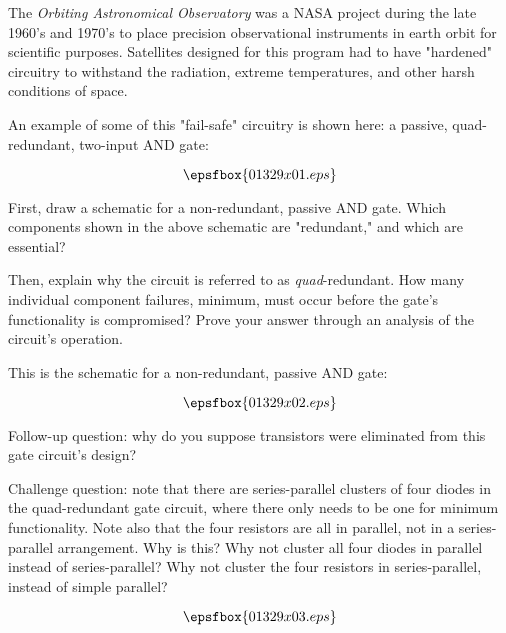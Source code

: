 

The {\it Orbiting Astronomical Observatory} was a NASA project during the late 1960's and 1970's to place precision observational instruments in earth orbit for scientific purposes.  Satellites designed for this program had to have "hardened" circuitry to withstand the radiation, extreme temperatures, and other harsh conditions of space.

An example of some of this "fail-safe" circuitry is shown here: a passive, quad-redundant, two-input AND gate:

$$\epsfbox{01329x01.eps}$$

First, draw a schematic for a non-redundant, passive AND gate.  Which components shown in the above schematic are "redundant," and which are essential?

Then, explain why the circuit is referred to as {\it quad}-redundant.  How many individual component failures, minimum, must occur before the gate's functionality is compromised?  Prove your answer through an analysis of the circuit's operation.







This is the schematic for a non-redundant, passive AND gate:

$$\epsfbox{01329x02.eps}$$

\vskip 10pt

Follow-up question: why do you suppose transistors were eliminated from this gate circuit's design?

\vskip 10pt

Challenge question: note that there are series-parallel clusters of four diodes in the quad-redundant gate circuit, where there only needs to be one for minimum functionality.  Note also that the four resistors are all in parallel, not in a series-parallel arrangement.  Why is this?  Why not cluster all four diodes in parallel instead of series-parallel?  Why not cluster the four resistors in series-parallel, instead of simple parallel?

$$\epsfbox{01329x03.eps}$$






